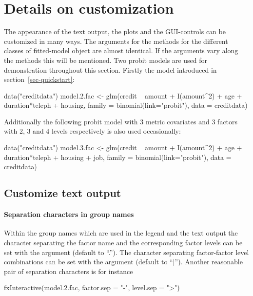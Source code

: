 \documentclass[nojss]{jss}
\newcommand{\quotes}[1]{``#1''}
\begin{document}
\section{Details on customization} \label{sec-customization}
The appearance of the text output, the plots and the GUI-controls can be customized in many ways.  The arguments for the methods for the different classes of fitted-model object are almost identical. If the arguments vary along the methods this will be mentioned. Two probit models are used for demonstration throughout this section. Firstly the model introduced in section~\ref{sec-quickstart}:
%
\begin{Schunk}
\begin{Sinput}
 data("creditdata")
 model.2.fac <- glm(credit ~ amount + I(amount^2)  + age + duration*teleph
     + housing, family = binomial(link="probit"), data = creditdata)
\end{Sinput}
\end{Schunk}
%
Additionally the following probit model with 3 metric covariates and 3 factors with 2, 3 and 4 levels respectively is also used occasionally:
%
\begin{Schunk}
\begin{Sinput}
 data("creditdata")
 model.3.fac <- glm(credit ~ amount + I(amount^2)  + age + duration*teleph 
     + housing + job, family = binomial(link="probit"), data = creditdata)
\end{Sinput}
\end{Schunk}
%

\subsection{Customize text output} \label{subsec-custom-text}

\vspace{-0.3cm}\paragraph{Separation characters in group names}
Within the group names which are used in the legend and the text output the character separating the factor name and the corresponding factor levels can be set with the argument  (default to \quotes{.}). The character separating factor-factor level combinations can be set with the argument  (default to \quotes{|}). Another reasonable pair of separation characters is for instance
%
\begin{Schunk}
\begin{Sinput}
 fxInteractive(model.2.fac, 
     factor.sep = "-",
     level.sep  = ">")
\end{Sinput}
\end{Schunk}
%
\end{document}
